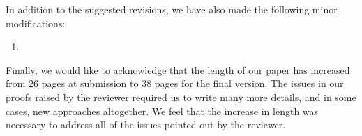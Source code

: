 \documentclass[11pt]{article}
\begin{document}
\hspace{-7mm} In addition to the suggested revisions, we have also made the following minor modifications:
\begin{enumerate}
	\item 
\end{enumerate}

Finally, we would like to acknowledge that the length of our paper has increased from 26 pages at submission to 38 pages for the final version. The issues in our proofs raised by the reviewer required us to write many more details, and in some cases, new approaches altogether. We feel that the increase in length was necessary to address all of the issues pointed out by the reviewer.
\end{document}
